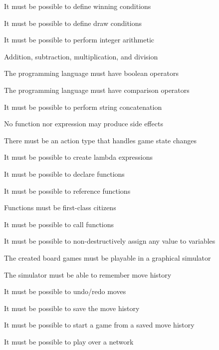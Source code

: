 \begin{nlist}
  \item It must be possible to define winning conditions
  \item It must be possible to define draw conditions
  \item It must be possible to perform integer arithmetic
  \begin{nlist}
    \item Addition, subtraction, multiplication, and division
    \item The programming language must have boolean operators
    \item The programming language must have comparison operators
  \end{nlist}
  \item It must be possible to perform string concatenation
  \item No function nor expression may produce side effects
  \item There must be an action type that handles game state changes
  \item It must be possible to create lambda expressions
  \item It must be possible to declare functions
  \item It must be possible to reference functions
  \begin{nlist}
    \item Functions must be first-class citizens
    \item It must be possible to call functions
  \end{nlist}
  \item It must be possible to non-destructively assign any value to variables
  \item The created board games must be playable in a graphical simulator
  \item The simulator must be able to remember move history
  \begin{nlist}
    \item It must be possible to undo/redo moves
    \item It must be possible to save the move history
    \begin{nlist}
      \item It must be possible to start a game from a saved move history
    \end{nlist}
  \item It must be possible to play over a network
  \end{nlist}
\end{nlist}


